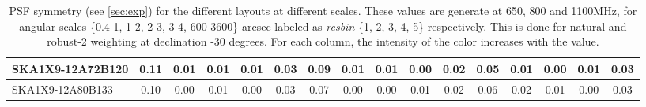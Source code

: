 \begin{table}[htp]
{{\begin{tabular}{|lccccc||ccccc||ccccc|}
SKA1X9-12A72B120 & 0.11 \cellcolor{blue!39.00} & 0.01 \cellcolor{red!28.50} & 0.01 \cellcolor{green!39.00} & 0.01 \cellcolor{orange!60.00} & 0.03 \cellcolor{purple!18.00} & 0.09 \cellcolor{blue!39.00} & 0.01 \cellcolor{red!32.00} & 0.01 \cellcolor{green!60.00} & 0.00 \cellcolor{orange!18.00} & 0.02 \cellcolor{purple!18.00} & 0.05 \cellcolor{blue!18.00} & 0.01 \cellcolor{red!18.00} & 0.00 \cellcolor{green!18.00} & 0.01 \cellcolor{orange!60.00} & 0.03 \cellcolor{purple!18.00}\\ \hline 
SKA1X9-12A80B133 & 0.10 \cellcolor{blue!18.00} & 0.00 \cellcolor{red!18.00} & 0.01 \cellcolor{green!39.00} & 0.00 \cellcolor{orange!18.00} & 0.03 \cellcolor{purple!18.00} & 0.07 \cellcolor{blue!18.00} & 0.00 \cellcolor{red!18.00} & 0.00 \cellcolor{green!18.00} & 0.01 \cellcolor{orange!60.00} & 0.02 \cellcolor{purple!18.00} & 0.06 \cellcolor{blue!39.00} & 0.02 \cellcolor{red!60.00} & 0.01 \cellcolor{green!60.00} & 0.00 \cellcolor{orange!18.00} & 0.03 \cellcolor{purple!18.00}\\ \hline 
\end{tabular}}
\vspace{-0.300000cm}
\hspace{1cm} 

\vspace{.25cm}
\caption{PSF symmetry (see \autoref{sec:exp})  for the different layouts at different scales. These values are generate at 650, 800 and 1100MHz, for angular scales \{0.4-1, 1-2, 2-3, 3-4, 600-3600\} arcsec labeled as {\it resbin} \{1, 2, 3, 4, 5\} respectively. This is done for natural and robust-2 weighting at declination -30 degrees. For each column, the intensity of the color increases with the value.}\label{tab:psf_sym}}
 \end{table}
